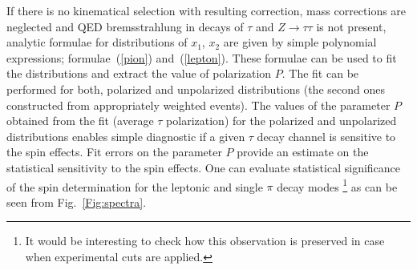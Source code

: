 \documentclass{article}
\begin{document}
If there is no kinematical selection with resulting correction, mass corrections are neglected and QED bremsstrahlung in decays of $\tau$ 
and $Z\to \tau\tau$ is not present, analytic formulae for distributions of $x_1$, $x_2$ are given by simple polynomial 
expressions; formulae~(\ref{pion}) and~(\ref{lepton}). 
These formulae can be used to fit the distributions and extract the value of polarization $P$.
The fit can be performed for both, polarized and unpolarized distributions (the second
ones constructed from appropriately weighted events).
The values  of the parameter $P$ obtained from the fit (average $\tau$ polarization) 
for the polarized and unpolarized distributions
enables simple diagnostic if a given $\tau$ decay channel is sensitive 
to the spin effects. Fit errors 
on the parameter $P$
provide an estimate on the statistical sensitivity to 
the spin effects.
One can evaluate statistical significance 
of the spin determination for the leptonic and single $\pi$ decay
 modes%
\footnote{It would be interesting to check how this observation is preserved
in case when experimental cuts are applied.} 
as can be seen from Fig.~\ref{Fig:spectra}.
\end{document}

